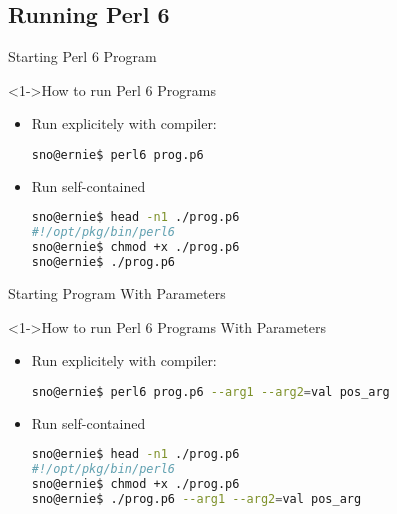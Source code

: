 \subsection{Running Perl 6}

\begin{frame}[fragile]{Starting Perl 6 Program}
\begin{block}<1->{How to run Perl 6 Programs}
\begin{itemize}
\item<1-> Run explicitely with compiler:
\begin{lstlisting}[language=sh,inputencoding=latin9]
sno@ernie$ perl6 prog.p6
\end{lstlisting}
\item<2-> Run self-contained
\begin{lstlisting}[language=sh,inputencoding=latin9]
sno@ernie$ head -n1 ./prog.p6
#!/opt/pkg/bin/perl6
sno@ernie$ chmod +x ./prog.p6
sno@ernie$ ./prog.p6
\end{lstlisting}
\end{itemize}
\end{block}
\end{frame}

\begin{frame}[fragile]{Starting Program With Parameters}
\begin{block}<1->{How to run Perl 6 Programs With Parameters}
\begin{itemize}
\item<1-> Run explicitely with compiler:
\begin{lstlisting}[language=sh,inputencoding=latin9]
sno@ernie$ perl6 prog.p6 --arg1 --arg2=val pos_arg
\end{lstlisting}
\item<2-> Run self-contained
\begin{lstlisting}[language=sh,inputencoding=latin9]
sno@ernie$ head -n1 ./prog.p6
#!/opt/pkg/bin/perl6
sno@ernie$ chmod +x ./prog.p6
sno@ernie$ ./prog.p6 --arg1 --arg2=val pos_arg
\end{lstlisting}
\end{itemize}
\end{block}
\end{frame}

